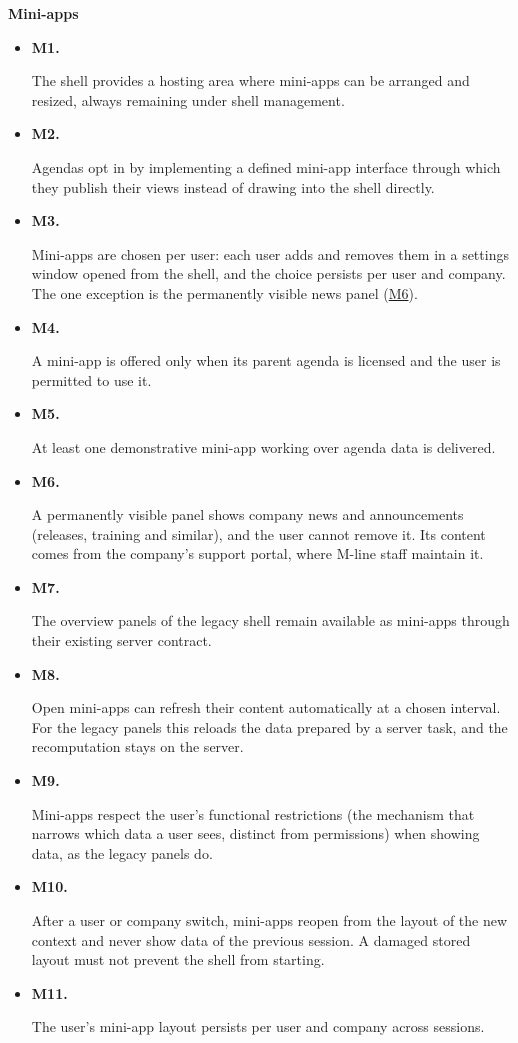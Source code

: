 \documentclass{article}
\newcommand{\reqdef}[1]{\hypertarget{req:#1}{\textbf{#1.}}}
\newcommand{\req}[1]{\hyperlink{req:#1}{#1}}
\begin{document}
\noindent \textbf{Mini-apps}
\begin{itemize}
  \item \reqdef{M1} The shell provides a hosting area where mini-apps can be arranged and resized, always remaining under shell management.
  \item \reqdef{M2} Agendas opt in by implementing a defined mini-app interface through which they publish their views instead of drawing into the shell directly.
  \item \reqdef{M3} Mini-apps are chosen per user: each user adds and removes them in a settings window opened from the shell, and the choice persists per user and company. The one exception is the permanently visible news panel (\req{M6}).
  \item \reqdef{M4} A mini-app is offered only when its parent agenda is licensed and the user is permitted to use it.
  \item \reqdef{M5} At least one demonstrative mini-app working over agenda data is delivered.
  \item \reqdef{M6} A permanently visible panel shows company news and announcements (releases, training and similar), and the user cannot remove it. Its content comes from the company's support portal, where M-line staff maintain it.
  \item \reqdef{M7} The overview panels of the legacy shell remain available as mini-apps through their existing server contract.
  \item \reqdef{M8} Open mini-apps can refresh their content automatically at a chosen interval. For the legacy panels this reloads the data prepared by a server task, and the recomputation stays on the server.
  \item \reqdef{M9} Mini-apps respect the user's functional restrictions (the mechanism that narrows which data a user sees, distinct from permissions) when showing data, as the legacy panels do.
  \item \reqdef{M10} After a user or company switch, mini-apps reopen from the layout of the new context and never show data of the previous session. A damaged stored layout must not prevent the shell from starting.
  \item \reqdef{M11} The user's mini-app layout persists per user and company across sessions.
\end{itemize}
\end{document}
